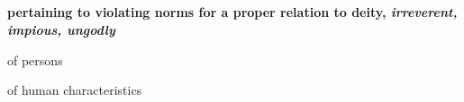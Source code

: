 			\subparagraph{\texorpdfstring{}{}}
				\label{ASEBES}
			
				\begin{compactdesc}
					\item[BDAG 123b] \textbf{}
						\begin{compactitem}
							\item[1] \textbf{pertaining to violating norms for a proper relation to deity, \textit{irreverent, impious, ungodly}}
							\item[1.a] of persons
							\item[1.b] of human characteristics
						\end{compactitem}
				\end{compactdesc}
				
				
				
		
			\subparagraph{\texorpdfstring{}{}}
				\label{EUSEBEIA}
			
